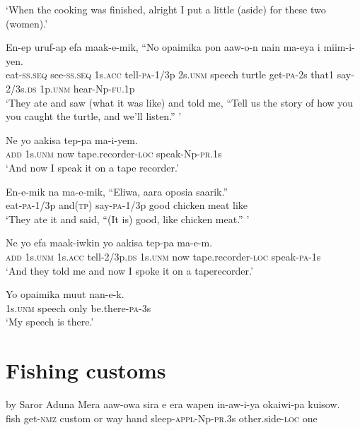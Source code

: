 \glt ‘When the cooking was finished, alright I put a little (aside) for these two (women).’ \\
\z


\ea
\gll  En-ep  uruf-ap  efa  maak-e-mik,  “No  opaimika     pon  aaw-o-n  nain  ma-eya  i  miim-i-yen. \\
eat-\textsc{ss.seq}  see-\textsc{ss.seq}  1s.\textsc{acc}  tell-\textsc{pa}-1/3p  2s.\textsc{unm}  speech  turtle  get-\textsc{pa}-2s  that1  say-2/3s.\textsc{ds}  1p.\textsc{unm}  hear-Np-\textsc{fu}.1p \\


\glt ‘They ate and saw (what it was like) and told me, “Tell us the story of how you you caught the turtle, and we’ll listen.” ’ \\
\z


\ea
\gll  Ne  yo  aakisa  tep-pa  ma-i-yem. \\
\textsc{add}  1s.\textsc{unm}  now  tape.recorder-\textsc{loc}  speak-Np-\textsc{pr}.1s \\
\glt ‘And now I speak it on a tape recorder.’ \\
\z


\ea
\gll  En-e-mik  na  ma-e-mik,  “Eliwa,  aara  oposia  saarik.” \\
eat-\textsc{pa}-1/3p  and(\textsc{tp})  say-\textsc{pa}-1/3p  good  chicken  meat  like \\
\glt ‘They ate it and said, “(It is) good, like chicken meat.” ’ \\
\z


\ea
\gll  Ne  yo  efa  maak-iwkin  yo  aakisa       tep-pa  ma-e-m. \\
 \textsc{add}  1s.\textsc{unm}  1s.\textsc{acc}  tell-2/3p.\textsc{ds}  1s.\textsc{unm}  now  tape.recorder-\textsc{loc}  speak-\textsc{pa}-1s \\


\glt ‘And they told me and now I spoke it on a taperecorder.’ \\
\z


\ea
\gll  Yo  opaimika  muut  nan-e-k. \\
1s.\textsc{unm}  speech  only  be.there-\textsc{pa}-3s \\
\glt ‘My speech is there.’ \\
\z


\setcounter{equation}{0}
\section{Fishing customs}
  by Saror Aduna
\ea
\gll  Mera  aaw-owa  sira  e  era  wapen  in-aw-i-ya        okaiwi-pa  kuisow. \\
fish  get-\textsc{nmz}  custom  or  way  hand  sleep-\textsc{appl}-Np-\textsc{pr}.3s   other.side-\textsc{loc}  one \\


